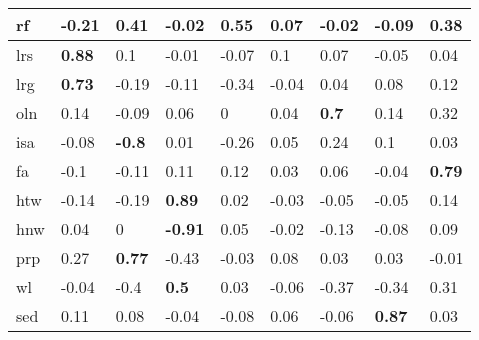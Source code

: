 \begin{table*}[!th]
\begin{tabular}{|l|l|l|l|l|l|l|l|l|}
rf        & -0.21         & 0.41          & -0.02          & \textbf{0.55}  & 0.07          & -0.02         & -0.09         & 0.38          \\ \hline
lrs       & \textbf{0.88} & 0.1           & -0.01          & -0.07          & 0.1           & 0.07          & -0.05         & 0.04          \\ \hline
lrg       & \textbf{0.73} & -0.19         & -0.11          & -0.34          & -0.04         & 0.04          & 0.08          & 0.12          \\ \hline
oln       & 0.14          & -0.09         & 0.06           & 0              & 0.04          & \textbf{0.7}  & 0.14          & 0.32          \\ \hline
isa       & -0.08         & \textbf{-0.8} & 0.01           & -0.26          & 0.05          & 0.24          & 0.1           & 0.03          \\ \hline
fa        & -0.1          & -0.11         & 0.11           & 0.12           & 0.03          & 0.06          & -0.04         & \textbf{0.79} \\ \hline
htw       & -0.14         & -0.19         & \textbf{0.89}  & 0.02           & -0.03         & -0.05         & -0.05         & 0.14          \\ \hline
hnw       & 0.04          & 0             & \textbf{-0.91} & 0.05           & -0.02         & -0.13         & -0.08         & 0.09          \\ \hline
prp       & 0.27          & \textbf{0.77} & -0.43          & -0.03          & 0.08          & 0.03          & 0.03          & -0.01         \\ \hline
wl        & -0.04         & -0.4          & \textbf{0.5}   & 0.03           & -0.06         & -0.37         & -0.34         & 0.31          \\ \hline
sed       & 0.11          & 0.08          & -0.04          & -0.08          & 0.06          & -0.06         & \textbf{0.87} & 0.03          \\ \hline
\end{tabular}

\end{table*}